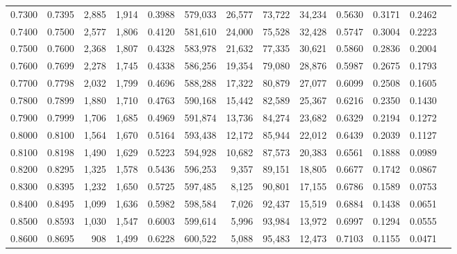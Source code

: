 \begin{tabular}{rrrrrrrrrrrrr}
0.7300 & 0.7395 &  2,885 & 1,914 &                                     0.3988 & 579,033 &  26,577 &  73,722 &  34,234 & 0.5630 & 0.3171 & 0.2462 \\
0.7400 & 0.7500 &  2,577 & 1,806 &                                     0.4120 & 581,610 &  24,000 &  75,528 &  32,428 & 0.5747 & 0.3004 & 0.2223 \\
0.7500 & 0.7600 &  2,368 & 1,807 &                                     0.4328 & 583,978 &  21,632 &  77,335 &  30,621 & 0.5860 & 0.2836 & 0.2004 \\
0.7600 & 0.7699 &  2,278 & 1,745 &                                     0.4338 & 586,256 &  19,354 &  79,080 &  28,876 & 0.5987 & 0.2675 & 0.1793 \\
0.7700 & 0.7798 &  2,032 & 1,799 &                                     0.4696 & 588,288 &  17,322 &  80,879 &  27,077 & 0.6099 & 0.2508 & 0.1605 \\
0.7800 & 0.7899 &  1,880 & 1,710 &                                     0.4763 & 590,168 &  15,442 &  82,589 &  25,367 & 0.6216 & 0.2350 & 0.1430 \\
0.7900 & 0.7999 &  1,706 & 1,685 &                                     0.4969 & 591,874 &  13,736 &  84,274 &  23,682 & 0.6329 & 0.2194 & 0.1272 \\
0.8000 & 0.8100 &  1,564 & 1,670 &                                     0.5164 & 593,438 &  12,172 &  85,944 &  22,012 & 0.6439 & 0.2039 & 0.1127 \\
0.8100 & 0.8198 &  1,490 & 1,629 &                                     0.5223 & 594,928 &  10,682 &  87,573 &  20,383 & 0.6561 & 0.1888 & 0.0989 \\
0.8200 & 0.8295 &  1,325 & 1,578 &                                     0.5436 & 596,253 &   9,357 &  89,151 &  18,805 & 0.6677 & 0.1742 & 0.0867 \\
0.8300 & 0.8395 &  1,232 & 1,650 &                                     0.5725 & 597,485 &   8,125 &  90,801 &  17,155 & 0.6786 & 0.1589 & 0.0753 \\
0.8400 & 0.8495 &  1,099 & 1,636 &                                     0.5982 & 598,584 &   7,026 &  92,437 &  15,519 & 0.6884 & 0.1438 & 0.0651 \\
0.8500 & 0.8593 &  1,030 & 1,547 &                                     0.6003 & 599,614 &   5,996 &  93,984 &  13,972 & 0.6997 & 0.1294 & 0.0555 \\
0.8600 & 0.8695 &    908 & 1,499 &                                     0.6228 & 600,522 &   5,088 &  95,483 &  12,473 & 0.7103 & 0.1155 & 0.0471 \\

\end{tabular}
